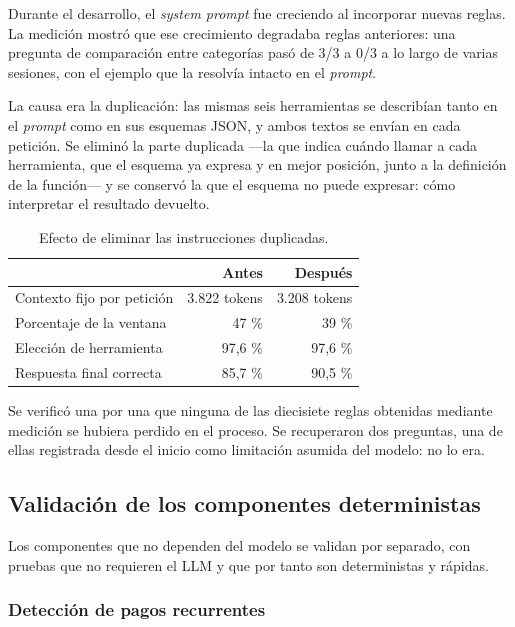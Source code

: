Durante el desarrollo, el \textit{system prompt} fue creciendo al incorporar
nuevas reglas. La medición mostró que ese crecimiento degradaba reglas
anteriores: una pregunta de comparación entre categorías pasó de 3/3 a 0/3 a lo
largo de varias sesiones, con el ejemplo que la resolvía intacto en el
\textit{prompt}.

La causa era la duplicación: las mismas seis herramientas se describían tanto en
el \textit{prompt} como en sus esquemas JSON, y ambos textos se envían en cada
petición. Se eliminó la parte duplicada —la que indica cuándo llamar a cada
herramienta, que el esquema ya expresa y en mejor posición, junto a la
definición de la función— y se conservó la que el esquema no puede expresar:
cómo interpretar el resultado devuelto.

\begin{table}[h]
\centering
\begin{tabular}{lrr}
\toprule
 & \textbf{Antes} & \textbf{Después} \\
\midrule
Contexto fijo por petición   & 3.822 tokens & 3.208 tokens \\
Porcentaje de la ventana     & 47 \%        & 39 \% \\
Elección de herramienta      & 97,6 \%      & 97,6 \% \\
Respuesta final correcta     & 85,7 \%      & 90,5 \% \\
\bottomrule
\end{tabular}
\caption{Efecto de eliminar las instrucciones duplicadas.}
\end{table}

Se verificó una por una que ninguna de las diecisiete reglas obtenidas mediante
medición se hubiera perdido en el proceso. Se recuperaron dos preguntas, una de
ellas registrada desde el inicio como limitación asumida del modelo: no lo era.

\subsection{Validación de los componentes deterministas}

Los componentes que no dependen del modelo se validan por separado, con pruebas
que no requieren el LLM y que por tanto son deterministas y rápidas.

\subsubsection{Detección de pagos recurrentes}

